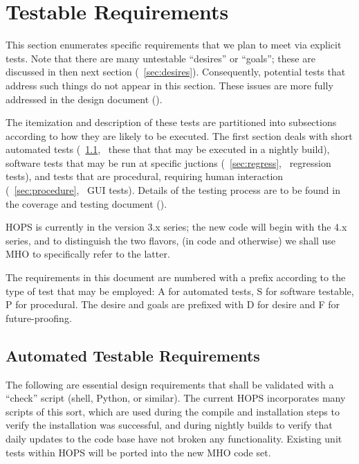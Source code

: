 %
%
%

\section{Testable Requirements}
\label{sec:testable}

This section enumerates specific requirements that we plan to meet via explicit
tests.
Note that there are many untestable ``desires'' or ``goals''; these are
discussed in then next section (\Sec~\ref{sec:desires}).  Consequently,
potential tests that address such things do not appear in this section.
These issues are more fully addressed in the design document (\cite{design}).

The itemization and description of these tests are partitioned into
subsections according to how they are likely to be executed.
The first section deals with short automated tests
(\Sec~\ref{sec:auto}, \ie~these that that may be executed
in a nightly build), software tests that may be run at specific
juctions (\Sec~\ref{sec:regress}, \ie~regression tests),
and tests that are procedural, requiring human interaction
(\Sec~\ref{sec:procedure}, \ie~\ac{GUI} tests).%
Details of the testing process are to be found in the coverage
and testing document (\cite{cover}).

\acs{HOPS} is currently in the version 3.x series; the new code will
begin with the 4.x series, and to distinguish the two flavors, (in code
and otherwise) we shall use \acs{MHO} to specifically refer to the latter.

The requirements in this document are numbered with a prefix
according to the type of test that may be employed:
A for automated tests, S for software testable, P for procedural.
The desire and goals are prefixed with D for desire and
F for future-proofing.

\subsection{Automated Testable Requirements}
\label{sec:auto}

The following are essential design requirements that shall be validated with a
``check'' script (shell, Python, or similar). The current \acs{HOPS} 
incorporates many scripts of this sort, which are used during the compile and
installation steps to verify the installation was successful, and during nightly 
builds to verify that daily updates to the code base have not broken any 
functionality. Existing unit tests within \ac{HOPS} will be ported into the new 
\ac{MHO} code set.

